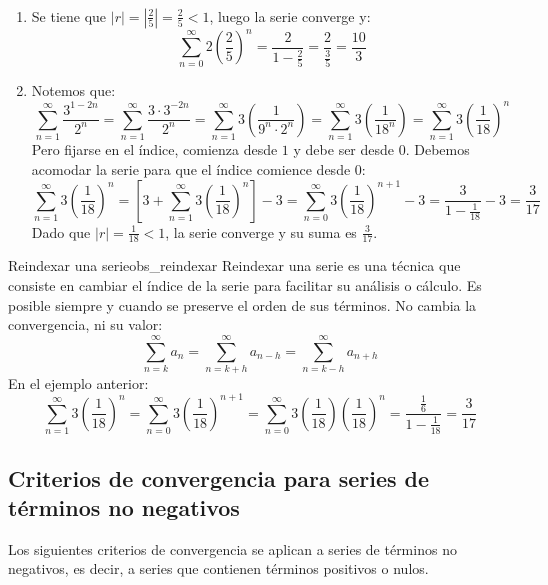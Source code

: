\begin{soln}
    $\left. \right.$
    \begin{enumerate}
        \item Se tiene que $|r| = \left|\frac{2}{5}\right| = \frac{2}{5} < 1$, luego la serie converge y:
        \[ \sum_{n=0}^{\infty}2\left(\frac{2}{5}\right)^n = \frac{2}{1-\frac{2}{5}} = \frac{2}{\frac{3}{5}} = \frac{10}{3} \]
        
        \item Notemos que:
        \[ \sum_{n=1}^{\infty}\frac{3^{1-2n}}{2^n} = \sum_{n=1}^{\infty}\frac{3 \cdot 3^{-2n}}{2^n} = \sum_{n=1}^{\infty}3\left(\frac{1}{9^n \cdot 2^n}\right) = \sum_{n=1}^{\infty}3\left(\frac{1}{18^n}\right) = \sum_{n=1}^{\infty}3\left(\frac{1}{18}\right)^n \]
        Pero fijarse en el índice, comienza desde $1$ y debe ser desde $0$. Debemos acomodar la serie para que el índice comience desde $0$:
        \[ \sum_{n=1}^{\infty}3\left(\frac{1}{18}\right)^n = \left[3 + \sum_{n=1}^{\infty}3\left(\frac{1}{18}\right)^n\right] - 3 = \sum_{n=0}^{\infty}3\left(\frac{1}{18}\right)^{n+1} - 3 = \frac{3}{1-\frac{1}{18}} - 3 = \frac{3}{17} \]
        Dado que $|r| = \frac{1}{18} < 1$, la serie converge y su suma es $\frac{3}{17}$.
    \end{enumerate}
\end{soln}

\begin{remark}{Reindexar una serie}{obs_reindexar}
    Reindexar una serie es una técnica que consiste en cambiar el índice de la serie para facilitar su análisis o cálculo. Es posible siempre y cuando se preserve el orden de sus términos. No cambia la convergencia, ni su valor:
    \[ \sum_{n=k}^{\infty}a_n = \sum_{n=k+h}^{\infty}a_{n-h} = \sum_{n=k-h}^{\infty}a_{n+h} \]
    En el ejemplo anterior:
    \[ \sum_{n=1}^{\infty}3\left(\frac{1}{18}\right)^n = \sum_{n=0}^{\infty}3\left(\frac{1}{18}\right)^{n+1} = \sum_{n=0}^{\infty}3\left(\frac{1}{18}\right)\left(\frac{1}{18}\right)^n = \frac{\frac{1}{6}}{1-\frac{1}{18}} = \frac{3}{17} \]
\end{remark}

\subsection{Criterios de convergencia para series de términos no negativos}

Los siguientes criterios de convergencia se aplican a series de términos no negativos, es decir, a series que contienen términos positivos o nulos.

